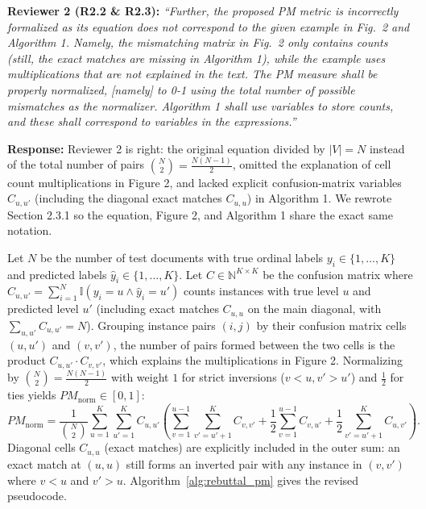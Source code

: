 \documentclass[11pt,a4paper]{article}
\begin{document}
\begin{reviewbox}
\textbf{Reviewer 2 (R2.2 \& R2.3):} \textit{``Further, the proposed PM metric is incorrectly formalized as its equation does not correspond to the given example in Fig.\ 2 and Algorithm 1. Namely, the mismatching matrix in Fig.\ 2 only contains counts (still, the exact matches are missing in Algorithm 1), while the example uses multiplications that are not explained in the text. The PM measure shall be properly normalized, [namely] to 0-1 using the total number of possible mismatches as the normalizer. Algorithm 1 shall use variables to store counts, and these shall correspond to variables in the expressions.''}
\end{reviewbox}

\noindent\textbf{Response:}
Reviewer 2 is right: the original equation divided by $|V| = N$ instead of the total number of pairs $\binom{N}{2} = \frac{N(N-1)}{2}$, omitted the explanation of cell count multiplications in Figure 2, and lacked explicit confusion-matrix variables $C_{u,u'}$ (including the diagonal exact matches $C_{u,u}$) in Algorithm 1. We rewrote Section 2.3.1 so the equation, Figure 2, and Algorithm 1 share the exact same notation.

Let $N$ be the number of test documents with true ordinal labels $y_i \in \{1, \dots, K\}$ and predicted labels $\hat{y}_i \in \{1, \dots, K\}$. Let $C \in \mathbb{N}^{K \times K}$ be the confusion matrix where $C_{u,u'} = \sum_{i=1}^N \mathbb{I}(y_i = u \land \hat{y}_i = u')$ counts instances with true level $u$ and predicted level $u'$ (including exact matches $C_{u,u}$ on the main diagonal, with $\sum_{u,u'} C_{u,u'} = N$). Grouping instance pairs $(i, j)$ by their confusion matrix cells $(u, u')$ and $(v, v')$, the number of pairs formed between the two cells is the product $C_{u,u'} \cdot C_{v,v'}$, which explains the multiplications in Figure 2. Normalizing by $\binom{N}{2} = \frac{N(N-1)}{2}$ with weight $1$ for strict inversions ($v < u, v' > u'$) and $\frac{1}{2}$ for ties yields $PM_{\text{norm}} \in [0, 1]$:
\begin{equation}
PM_{\text{norm}} = \frac{1}{\binom{N}{2}} \sum_{u=1}^{K} \sum_{u'=1}^{K} C_{u,u'} \left( \sum_{v=1}^{u-1} \sum_{v'=u'+1}^{K} C_{v,v'} + \frac{1}{2} \sum_{v=1}^{u-1} C_{v,u'} + \frac{1}{2} \sum_{v'=u'+1}^{K} C_{u,v'} \right).
\label{eq:rebuttal_pm_norm}
\end{equation}
Diagonal cells $C_{u,u}$ (exact matches) are explicitly included in the outer sum: an exact match at $(u, u)$ still forms an inverted pair with any instance in $(v, v')$ where $v < u$ and $v' > u$. Algorithm~\ref{alg:rebuttal_pm} gives the revised pseudocode.
\end{document}
